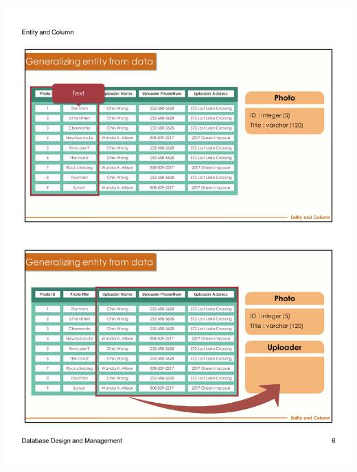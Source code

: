 \begin{frame}{ }
    \centering
    \includegraphics[width=\textwidth, trim={10mm 24mm 10mm 134mm}, clip]{resources/02/02_6}
\end{frame}
